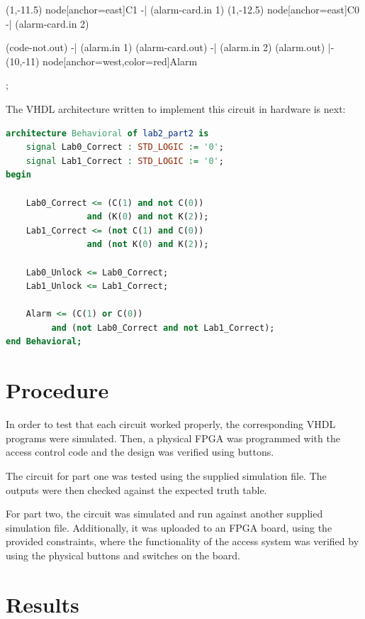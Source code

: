 \documentclass{article}
\begin{document}
\begin{circuitikz}[scale=0.75, transform shape]
            (1,-11.5) node[anchor=east]{C1} -| (alarm-card.in 1)
            (1,-12.5) node[anchor=east]{C0} -| (alarm-card.in 2)

            (code-not.out) -| (alarm.in 1)
            (alarm-card.out) -| (alarm.in 2)
            (alarm.out) |- (10,-11) node[anchor=west,color=red]{Alarm}

        ;
    \end{circuitikz}

    The VHDL architecture written to implement this circuit in hardware is next:

    \begin{lstlisting}[language=VHDL]
architecture Behavioral of lab2_part2 is
    signal Lab0_Correct : STD_LOGIC := '0';
    signal Lab1_Correct : STD_LOGIC := '0';
begin

    Lab0_Correct <= (C(1) and not C(0))
                and (K(0) and not K(2));
    Lab1_Correct <= (not C(1) and C(0))
                and (not K(0) and K(2));
    
    Lab0_Unlock <= Lab0_Correct;
    Lab1_Unlock <= Lab1_Correct;
    
    Alarm <= (C(1) or C(0))
         and (not Lab0_Correct and not Lab1_Correct);
end Behavioral;
    \end{lstlisting}
    \newpage

    \section{Procedure}
    In order to test that each circuit worked properly, the
    corresponding VHDL programs were simulated. Then, a physical
    FPGA was programmed with the access control code and the
    design was verified using buttons.

    The circuit for part one was tested using the supplied simulation
    file. The outputs were then checked against the expected truth table.

    For part two, the circuit was simulated and run against another
    supplied simulation file. Additionally, it was uploaded to an FPGA
    board, using the provided constraints, where the functionality
    of the access system was verified by using the physical buttons
    and switches on the board.


    \section{Results}
\end{document}
